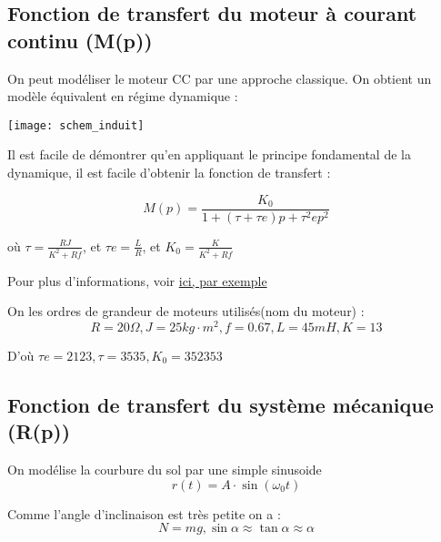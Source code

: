 \documentclass[11pt]{article} %
\begin{document}
\subsection{Fonction de transfert du moteur à courant continu (M(p))}

On peut modéliser le moteur CC par une approche classique. On obtient un modèle équivalent en régime dynamique :

\texttt{[image: schem\_induit]}

Il est facile de démontrer qu'en appliquant le principe fondamental de la dynamique, il est facile d'obtenir la fonction de transfert :


\begin{equation} M(p) = \frac{K_0}{1 + (\tau + \tau e)p + \tau^2 ep^2} \end{equation} 

où \begin{math}  \tau = \frac{RJ}{K^2 + Rf} \end{math}, et \begin{math} \tau e = \frac{L}{R}\end{math}, et \begin{math} K_0 = \frac{K}{K^2 + Rf} \end{math}

Pour plus d'informations, voir \href{http://physiquenetappliquee.free.fr/Modele_dyna_MCC.php}{ici, par exemple}

On les ordres de grandeur de moteurs utilisés(nom du moteur) : 
\begin{equation} R=20\Omega ,  J=25 kg  \cdot m^2 , f=0.67 , L =45mH , K=13 \end{equation}

D'où \begin{math} \tau e = 2123 , \tau = 3535 , K_0 = 352353\end{math}

\subsection{Fonction de transfert du système mécanique (R(p))}

On modélise la courbure du sol par une simple sinusoide \begin{equation}  r(t) = A \cdot \sin (\omega_0 t) \end{equation}

Comme l'angle d'inclinaison est très petite on a : \begin{equation} N = mg , \sin \alpha \approx \tan \alpha \approx \alpha\end{equation} 
\end{document}
